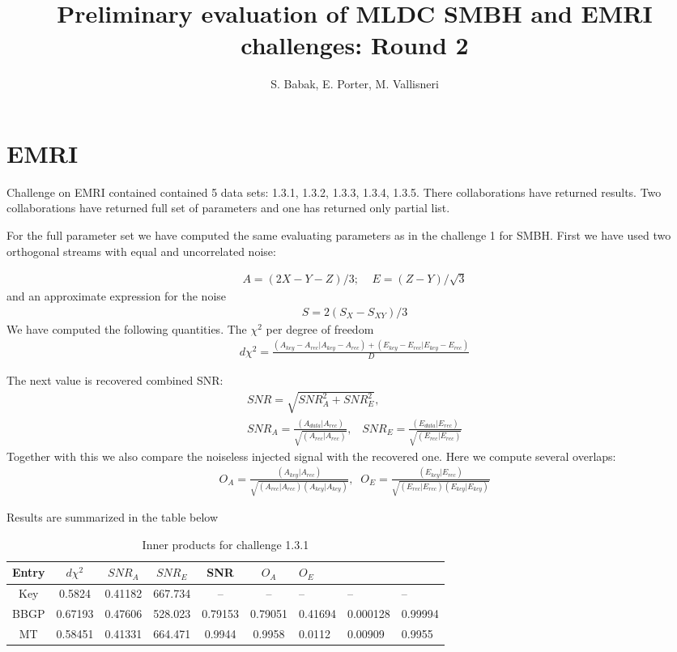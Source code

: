 \documentclass[prd,aps,amsfonts,amsmath, nofootinbib]{revtex4}
\def\bea{\begin{eqnarray}}
\def\ena{\end{eqnarray}}
\begin{document}
\title{Preliminary evaluation of MLDC SMBH and EMRI challenges: 
Round 2}
\author{S. Babak, E. Porter, M. Vallisneri}
\maketitle

\section{EMRI}

Challenge on EMRI contained contained 5 data sets: 1.3.1, 1.3.2, 1.3.3, 1.3.4, 1.3.5.
There collaborations have returned results. Two collaborations have returned full set of parameters and one has returned only partial list.

For the full parameter set we have computed the same evaluating
parameters as in the challenge 1 for SMBH.
First we have  used two orthogonal streams with equal and uncorrelated noise:

\bea
A = (2X - Y - Z)/3; \;\;\;\; E = (Z - Y)/\sqrt{3}
\ena
and an approximate expression for the noise 
\bea
S = 2(S_X - S_{XY})/3
\ena
We have computed the following quantities. The $\chi^2$ per degree
of freedom
\bea
d\chi^{2} = \frac{(A_{key}- A_{rec}|A_{key}- A_{rec}) +
(E_{key} - E_{rec}|E_{key} - E_{rec})}
{D}
\ena

The next value is recovered combined SNR:
\bea
SNR  = \sqrt{SNR_A^2 + SNR_E^2},\\
SNR_A = \frac{(A_{data}|A_{rec})}{\sqrt{(A_{rec}|A_{rec})}},\;\;\;
SNR_E= \frac{(E_{data}|E_{rec})}{\sqrt{(E_{rec}|E_{rec})}}
\ena
Together with this we also compare the noiseless injected signal with
the recovered one. Here we compute several overlaps:
\bea
O_A = \frac{(A_{key}|A_{rec})}{\sqrt{(A_{rec}|A_{rec})(A_{key}|A_{key})}}, \;\;
O_E = \frac{(E_{key}|E_{rec})}{\sqrt{(E_{rec}|E_{rec})(E_{key}|E_{key})}}
\ena

Results are summarized in the table below
\begin{table}
\caption{\label{OlapsTable1.2.1} Inner products for challenge 1.3.1}
\begin{ruledtabular}
\begin{tabular}{|c|c|c|c|c|c|}
Entry & $d\chi^2$ & $SNR_A$ & $SNR_E$ & SNR & $O_A$ & $O_E$\\
\hline
Key & 0.5824 & 0.41182 & 667.734 &  -- & -- & -- & -- & -- \\
BBGP & 0.67193 & 0.47606 & 528.023 & 0.79153 & 0.79051 &
0.41694 & 0.000128 & 0.99994\\
MT & 0.58451 & 0.41331 & 664.471 & 0.9944 & 0.9958 & 0.0112 &  0.00909 & 0.9955\\
\hline
\end{tabular}
\end{ruledtabular}
\end{table}
\end{document}
